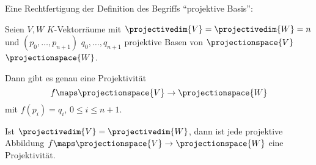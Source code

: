 Eine Rechtfertigung der Definition des Begriffs \enquote{projektive Basis}:
\begin{satz}\label{projektive_basen_sind_basig}
  Seien \( V,W \) \( K \)-Vektorräume mit \( \projectivedim{V}=\projectivedim{W}=n \) und \( (p_0,\dotsc,p_{n+1}) \) \bzw \( q_0,\dotsc,q_{n+1}  \) projektive Basen von \( \projectionspace{V} \) \bzw \( \projectionspace{W} \).

  Dann gibt es genau eine Projektivität
  \begin{equation*}
    f\maps \projectionspace{V}\to \projectionspace{W}
  \end{equation*}
  mit \( f(p_i)=q_i \), \( 0\leq i\leq n+1 \).
\end{satz}
\begin{bemerkung*}
  Ist \( \projectivedim{V}= \projectivedim{W}\), dann ist jede projektive Abbildung \( f\maps \projectionspace{V}\to \projectionspace{W}  \) eine Projektivität.
\end{bemerkung*}
